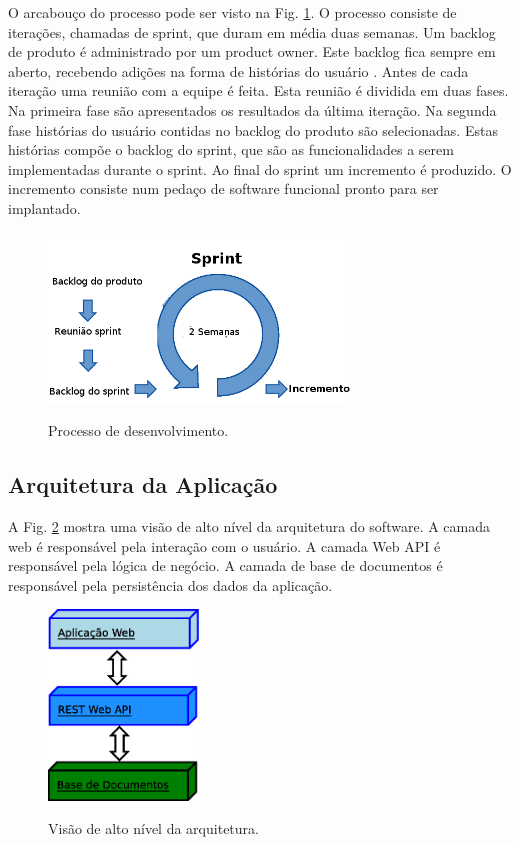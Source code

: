 \documentclass[journal]{IEEEtran}
\begin{document}
O arcabouço do processo pode ser visto na Fig. \ref{dev_proc}. O processo
consiste de iterações, chamadas de sprint, que duram em média duas
semanas. Um backlog de produto é administrado por um product owner. 
Este backlog fica sempre em aberto, recebendo adições na forma de
histórias do usuário \cite{cohn2004}. Antes de cada iteração uma reunião
com a equipe é feita. Esta reunião é dividida em duas fases. Na primeira
fase são apresentados os resultados da última iteração. Na segunda fase
histórias do usuário contidas no backlog do produto são selecionadas.
Estas histórias compõe o backlog do sprint, que são as funcionalidades a serem implementadas
durante o sprint. Ao final do sprint
um incremento é produzido. O incremento consiste num pedaço de software
funcional pronto para ser implantado.

\begin{figure}[!t]
	\centering
	{\includegraphics[width=8cm]{scrum_projeto}}
	\caption{Processo de desenvolvimento.}
	\label{dev_proc}
\end{figure}


\subsection{Arquitetura da Aplicação}
A Fig. \ref{camadas} mostra uma visão de alto nível da
arquitetura do software. A camada web é responsável pela interação com o usuário. 
A camada Web API  é responsável pela lógica de negócio. 
A camada de base de documentos é responsável pela
persistência dos dados da aplicação.
\begin{figure}[!t]
	\centering
	{\includegraphics[width=4cm]{camadas}}
	\caption{Visão de alto nível da arquitetura.}
	\label{camadas}
\end{figure}
\end{document}

